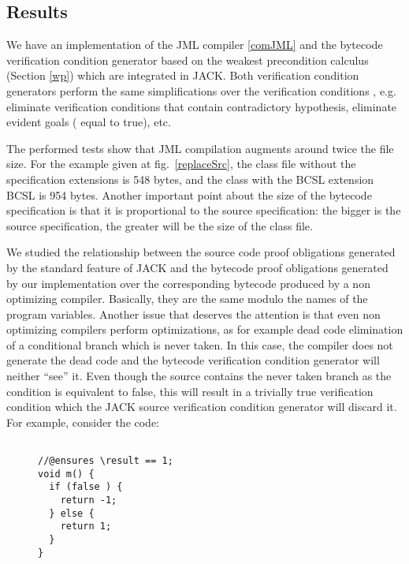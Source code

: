 
\subsection{Results}  \label{results}


We have an implementation of the JML compiler \ref{comJML} and the bytecode verification condition generator based on the weakest precondition calculus (Section \ref{wp}) 
which are integrated in JACK. Both verification condition generators perform the same simplifications over the verification conditions 
, e.g. eliminate verification conditions that contain contradictory hypothesis, eliminate evident goals ( equal to true), etc. 

The performed tests show that JML compilation augments around twice the file size. 
For the example given at fig.~\ref{replaceSrc}, the class file without the specification extensions is 548 bytes, 
and the class with the BCSL extension BCSL is 954 bytes. 
Another important point about the size of the bytecode specification is that it is proportional to the source specification: 
the bigger is the source specification, the greater will be the size of the class file. 


We studied the relationship between the source code proof obligations generated 
by the standard feature of JACK and the bytecode proof obligations generated by our implementation over the corresponding bytecode
 produced by a non optimizing compiler. Basically, they are the same modulo the names of the program variables. Another issue that
 deserves the attention is that even non optimizing compilers perform optimizations, as for example dead code elimination of
 a conditional branch which is never taken.
In this case, the compiler does not generate the dead code and the bytecode verification condition generator will neither ``see'' it. 
Even though the source contains the never taken branch as the condition is equivalent to false, this will result in a trivially true
verification condition which the JACK source verification condition generator will discard it. For example, consider the code:

\begin{figure}
\begin{verbatim}

//@ensures \result == 1;
void m() {
  if (false ) {
    return -1;
  } else {
    return 1;
  }
}

\end{verbatim}
\end{figure}

